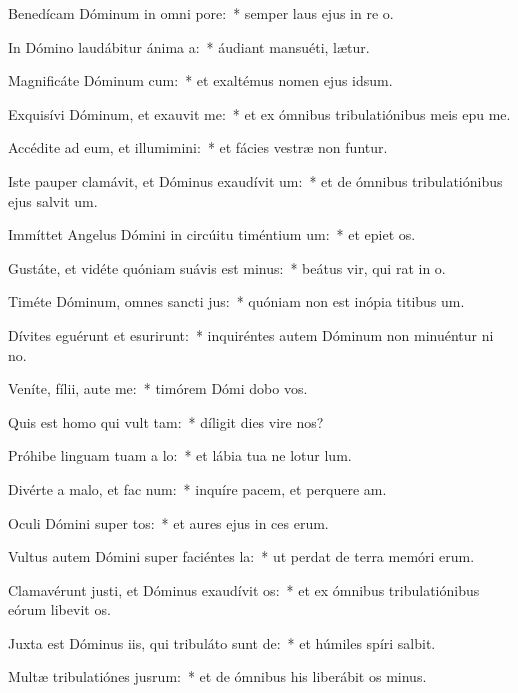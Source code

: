 \item Benedícam Dóminum in omni pore:~* semper laus ejus in re o.
\item In Dómino laudábitur ánima a:~* áudiant mansuéti,  lætur.
\item Magnificáte Dóminum cum:~* et exaltémus nomen ejus  idsum.
\item Exquisívi Dóminum, et exauvit me:~* et ex ómnibus tribulatiónibus meis epu me.
\item Accédite ad eum, et illumimini:~* et fácies vestræ non funtur.
\item Iste pauper clamávit, et Dóminus exaudívit um:~* et de ómnibus tribulatiónibus ejus salvit um.
\item Immíttet Angelus Dómini in circúitu timéntium um:~* et epiet os.
\item Gustáte, et vidéte quóniam suávis est minus:~* beátus vir, qui rat in o.
\item Timéte Dóminum, omnes sancti jus:~* quóniam non est inópia titibus um.
\item Dívites eguérunt et esurirunt:~* inquiréntes autem Dóminum non minuéntur ni no.
\item Veníte, fílii, aute me:~* timórem Dómi dobo vos.
\item Quis est homo qui vult tam:~* díligit dies vire nos?
\item Próhibe linguam tuam a lo:~* et lábia tua ne lotur lum.
\item Divérte a malo, et fac num:~* inquíre pacem, et perquere am.
\item Oculi Dómini super tos:~* et aures ejus in ces erum.
\item Vultus autem Dómini super faciéntes la:~* ut perdat de terra memóri erum.
\item Clamavérunt justi, et Dóminus exaudívit os:~* et ex ómnibus tribulatiónibus eórum libevit os.
\item Juxta est Dóminus iis, qui tribuláto sunt de:~* et húmiles spíri salbit.
\item Multæ tribulatiónes jusrum:~* et de ómnibus his liberábit os minus.
